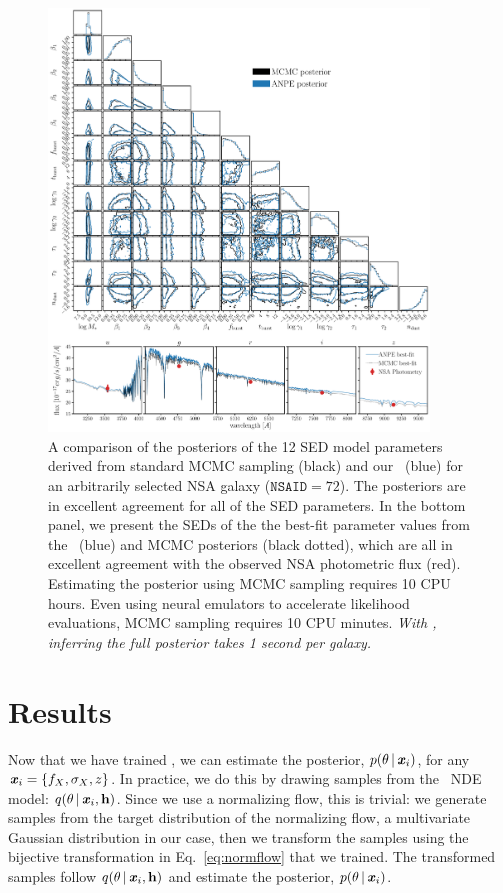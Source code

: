 \begin{figure}
\begin{center}
    \includegraphics[width=0.9\textwidth]{figs/corner.pdf}
    \caption{\label{fig:corner}
    A comparison of the posteriors of the 12 SED model parameters derived from
    standard MCMC sampling (black) and our \sedflow~(blue) for an arbitrarily
    selected NSA galaxy ($\mathtt{NSAID} = 72$).
    The posteriors are in excellent agreement for all of the SED parameters. 
    In the bottom panel, we present the SEDs of the the best-fit parameter
    values from the \sedflow~(blue) and MCMC posteriors (black dotted), which
    are all in excellent agreement with the observed NSA photometric flux
    (red). 
    Estimating the posterior using MCMC sampling requires 10 CPU hours. 
    Even using neural emulators to accelerate likelihood evaluations, MCMC
    sampling requires 10 CPU minutes. 
    \emph{With \sedflow, inferring the full posterior takes 1 second per
    galaxy.}
    }
\end{center}
\end{figure}

\section{Results} \label{sec:results}
Now that we have trained \sedflow, we can estimate the posterior,
$p(\theta\,|\, \textbf{\textit{x}}_i)$, for any $\textbf{\textit{x}}_i = \{f_X, \sigma_X, z \}$. 
In practice, we do this by drawing samples from the \sedflow~NDE model:
$q(\theta\,|\, \textbf{\textit{x}}_i, {\bf h})$. 
Since we use a normalizing flow, this is trivial:
we generate samples from the target distribution of the normalizing flow,  a
multivariate Gaussian distribution in our case, then we transform the samples
using the bijective transformation in Eq.~\ref{eq:normflow} that we trained.
The transformed samples follow $q(\theta\,|\, \textbf{\textit{x}}_i, {\bf h})$ and 
estimate the posterior, $p(\theta\,|\, \textbf{\textit{x}}_i)$. 

